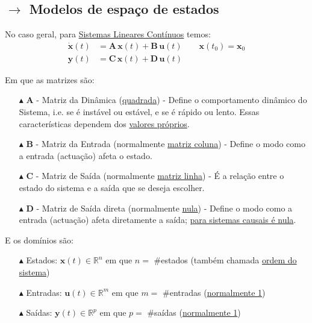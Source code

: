 \subsection[1.1 Modelos de espaço de estados]{$\rightarrow$ Modelos de espaço de estados\cite{Lemos2019}}
\label{subsec:state-space-model}


\noindent No caso geral, para \underline{Sistemas Lineares Contínuos} temos:
\begin{align*}
    \dot{\pmb{x}}(t) &= \pmb{A}\, \pmb{x}(t) + \pmb{B}\, \pmb{u}(t)\qquad \pmb{x}(t_0) = \pmb{x}_0 \\
    \pmb{y}(t) &= \pmb{C}\, \pmb{x}(t) + \pmb{D}\, \pmb{u}(t)
\end{align*}

\noindent Em que as matrizes são:
\begin{enumerate}\footnotesize
    \item[$\blacktriangle$] $\pmb{A}$ - Matriz da Dinâmica (\underline{quadrada}) - Define o comportamento dinâmico do Sistema, i.e. se é instável ou estável, e se é rápido ou lento. Essas características dependem dos \underline{valores próprios}.
    \item[$\blacktriangle$] $\pmb{B}$ - Matriz da Entrada (normalmente \underline{matriz coluna}) - Define o modo como a entrada (actuação) afeta o estado.
    \item[$\blacktriangle$] $\pmb{C}$ - Matriz de Saída (normalmente \underline{matriz linha}) - É a relação entre o estado do sistema e a saída que se deseja escolher.
    \item[$\blacktriangle$] $\pmb{D}$ - Matriz de Saída direta (normalmente \underline{nula}) - Define o modo como a entrada (actuação) afeta diretamente a saída; \underline{para sistemas causais é nula}.
\end{enumerate}

\noindent E os domínios são:
\begin{enumerate}\footnotesize
    \item[$\blacktriangle$] Estados: $\pmb{x}(t)\in \mathbb{R}^n$ em que $n =$ \#estados (também chamada \underline{ordem do sistema}) %
    \item[$\blacktriangle$] Entradas: $\pmb{u}(t)\in \mathbb{R}^m$ em que $m =$ \#entradas (\underline{normalmente 1})
    \item[$\blacktriangle$] Saídas: $\pmb{y}(t)\in \mathbb{R}^p$ em que $p =$ \#saídas (\underline{normalmente 1})
\end{enumerate}

